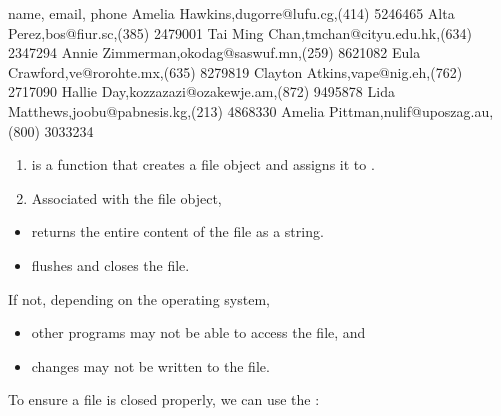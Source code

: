 \documentclass[letterpaper,10pt,english]{sphinxmanual}
\begin{document}
\begin{sphinxVerbatim}[commandchars=\\\{\}]
name, email, phone
Amelia Hawkins,dugorre@lufu.cg,(414) 524\PYGZhy{}6465
Alta Perez,bos@fiur.sc,(385) 247\PYGZhy{}9001
Tai Ming Chan,tmchan@cityu.edu.hk,(634) 234\PYGZhy{}7294
Annie Zimmerman,okodag@saswuf.mn,(259) 862\PYGZhy{}1082
Eula Crawford,ve@rorohte.mx,(635) 827\PYGZhy{}9819
Clayton Atkins,vape@nig.eh,(762) 271\PYGZhy{}7090
Hallie Day,kozzazazi@ozakewje.am,(872) 949\PYGZhy{}5878
Lida Matthews,joobu@pabnesis.kg,(213) 486\PYGZhy{}8330
Amelia Pittman,nulif@uposzag.au,(800) 303\PYGZhy{}3234
\end{sphinxVerbatim}
\begin{enumerate}
%
\item {} 
 is a function that creates a file object and assigns it to .

\item {} 
Associated with the file object,

\end{enumerate}
\begin{itemize}
\item {} 
 returns the entire content of the file as a string.

\item {} 
 flushes and closes the file.

\end{itemize}


If not, depending on the operating system,
\begin{itemize}
\item {} 
other programs may not be able to access the file, and

\item {} 
changes may not be written to the file.

\end{itemize}

To ensure a file is closed properly, we can use the :
\end{document}
